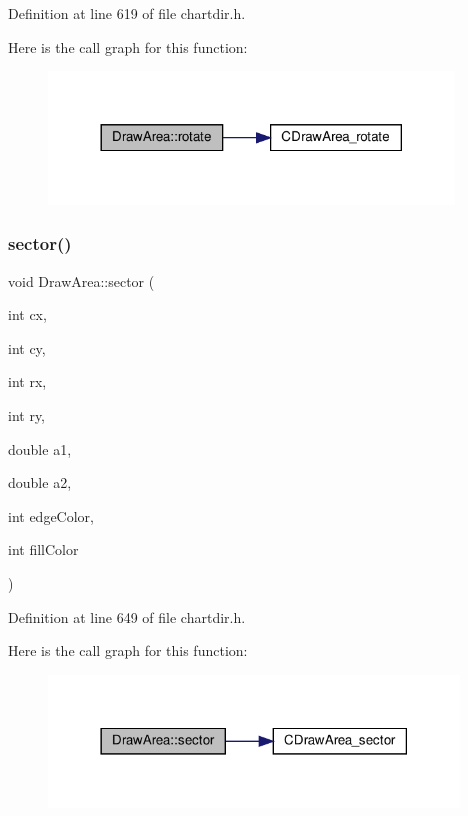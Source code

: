 Definition at line 619 of file chartdir.\+h.

Here is the call graph for this function\+:
\nopagebreak
\begin{figure}[H]
\begin{center}
\leavevmode
\includegraphics[width=305pt]{class_draw_area_a3acdbb124af9bc6a8adab97118b2081a_cgraph}
\end{center}
\end{figure}
\mbox{\label{class_draw_area_a6ba04aca84505370c0f6d35fa3ef4cb9}} 
\subsubsection{\texorpdfstring{sector()}{sector()}}
{\footnotesize\ttfamily void Draw\+Area\+::sector (\begin{DoxyParamCaption}\item[{int}]{cx,  }\item[{int}]{cy,  }\item[{int}]{rx,  }\item[{int}]{ry,  }\item[{double}]{a1,  }\item[{double}]{a2,  }\item[{int}]{edge\+Color,  }\item[{int}]{fill\+Color }\end{DoxyParamCaption})\hspace{0.3cm}{\ttfamily [inline]}}



Definition at line 649 of file chartdir.\+h.

Here is the call graph for this function\+:
\nopagebreak
\begin{figure}[H]
\begin{center}
\leavevmode
\includegraphics[width=309pt]{class_draw_area_a6ba04aca84505370c0f6d35fa3ef4cb9_cgraph}
\end{center}
\end{figure}
\mbox{\label{class_draw_area_ae92db9b13c442678d5be8d16470c7bed}} 
